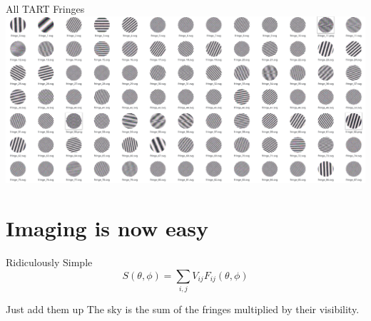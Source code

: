 \documentclass[ignorenonframetext]{beamer}
\begin{document}
\begin{frame}
\begin{columns}
\begin{column}{0.7\linewidth}
\begin{center}
  \end{center}
 \end{column}
\end{columns}
\end{frame}

\begin{frame}{All TART Fringes}
  \includegraphics[width=\linewidth]{images/all_fringes.png}
\end{frame}

\section{Imaging is now easy}

\frame{\tableofcontents[currentsection]}

\begin{frame}{Ridiculously Simple}
 \[ S(\theta, \phi) = \sum_{i,j} V_{ij} F_{ij}(\theta, \phi)\]
 \begin{block}{Just add them up}
  The sky is the sum of the fringes multiplied by their visibility.
 \end{block}
\end{frame}
\end{document}
